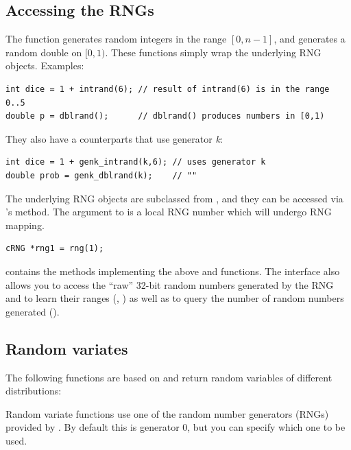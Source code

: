 \subsection{Accessing the RNGs}

The  function generates random integers in the range $[0, n-1]$, and
 generates a random double on $[0,1)$. These functions
simply wrap the underlying RNG objects. Examples:

\begin{verbatim}
int dice = 1 + intrand(6); // result of intrand(6) is in the range 0..5
double p = dblrand();      // dblrand() produces numbers in [0,1)
\end{verbatim}

They also have a counterparts that use generator \textit{k}:

\begin{verbatim}
int dice = 1 + genk_intrand(k,6); // uses generator k
double prob = genk_dblrand(k);    // ""
\end{verbatim}

The underlying RNG objects are subclassed from ,
and they can be accessed via 's  method.
The argument to  is a local RNG number which will undergo
RNG mapping.

\begin{verbatim}
cRNG *rng1 = rng(1);
\end{verbatim}

 contains the methods implementing the above 
and  functions. The  interface also allows
you to access the ``raw'' 32-bit random numbers generated by the RNG
and to learn their ranges (, ) as well as
to query the number of random numbers generated ().


\subsection{Random variates}

The following functions are based on  and return
random variables of different distributions:

Random variate functions use one of the random number generators (RNGs)
provided by \opp. By default this is generator 0, but you can specify
which one to be used.

